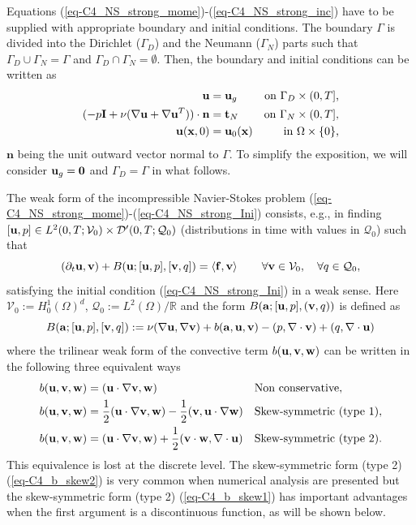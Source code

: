 Equations (\ref{eq-C4_NS_strong_mome})-(\ref{eq-C4_NS_strong_inc}) have to be supplied with appropriate boundary and initial conditions. The boundary $\Gamma$ is divided into the Dirichlet ($\Gamma_D$) and the Neumann ($\Gamma_N$) parts such that $\Gamma_D\cup\Gamma_N=\Gamma$ and $\Gamma_D\cap\Gamma_N=\emptyset$. Then, the boundary and initial conditions can be written as
\begin{align}
\label{eq-C4_NS_strong_Dir}
{\bf u}&={\bf u}_g&\mbox{on $\Gamma_D\times(0,T]$,}\\
\label{eq-C4_NS_strong_Neu}
(-p \mathbf{I}+\nu(\nabla{\bf u}+\nabla{\bf u}^T))\cdot\mathbf{n}&=\mathbf{t}_N&\mbox{on $\Gamma_N\times(0,T]$,}\\
\label{eq-C4_NS_strong_Ini}
{\bf u}({\bf x},0)&={\bf u}_0({\bf x})&\mbox{in $\Omega\times\{0\}$,}
\end{align}
$\mathbf{n}$ being the unit outward vector normal to $\Gamma$. To simplify the exposition, we will consider ${\bf u}_g = {\bf 0}$ and $\Gamma_D = \Gamma$ in what follows.

The weak form of the incompressible Navier-Stokes problem (\ref{eq-C4_NS_strong_mome})-(\ref{eq-C4_NS_strong_Ini}) consists, e.g., in finding $[{\bf u},p]\in {L}^2(0,T;\mathcal{V}_0)\times {\cal D}'(0,T;\mathcal{Q}_0)$ (distributions in time with values in $\mathcal{Q}_0$) such that
\begin{equation}
\label{eq-C4_NS_weak}
(\partial_t{\bf u},{\bf v}) + B({\bf u};[{\bf u},p],[{\bf v},q]) = \left<{\bf f},{\bf v}\right> 
\quad\quad\forall{\bf v}\in\mathcal{V}_0,\quad\forall q\in\mathcal{Q}_0,
\end{equation}
satisfying the initial condition (\ref{eq-C4_NS_strong_Ini}) in a weak sense. Here $\mathcal{V}_0:={H}_0^1(\Omega)^d$, $\mathcal{Q}_0:=L^2(\Omega)/\mathbb{R}$ and the form $B({{\bf a}};[{\bf u},p],({\bf v},q))$ is defined as 
\begin{equation}
\label{eq-C4_bilinear}
B({\bf a};[{\bf u},p],[{\bf v},q]):=\nu(\nabla{\bf u},\nabla{\bf v})+b({\bf a},{\bf u},{\bf v})-(p,\nabla\cdot{\bf v})+(q,\nabla\cdot{\bf u})
\end{equation}
where the trilinear weak form of the convective term $b({\bf u},{\bf v},{\bf w})$ can be written in the following three equivalent ways
\begin{align}
\label{eq-C4_b_noskew}
&b({\bf u},{\bf v},{\bf w})=({\bf u}\cdot\nabla{\bf v},{\bf w})&&\mbox{Non conservative},\\
\label{eq-C4_b_skew1}
&b({\bf u},{\bf v},\mathbf{w})=\frac{1}{2}({\bf u}\cdot\nabla{\bf v},\mathbf{w})-\frac{1}{2}({\bf v},{\bf u}\cdot\nabla\mathbf{w})&&\mbox{Skew-symmetric (type 1)},\\
\label{eq-C4_b_skew2}
&b({\bf u},{\bf v},\mathbf{w})=({\bf u}\cdot\nabla{\bf v},\mathbf{w})+\frac{1}{2}({\bf v}\cdot\mathbf{w},\nabla\cdot{\bf u})&&\mbox{Skew-symmetric (type 2)}.
\end{align}
This equivalence is lost at the discrete level. The skew-symmetric form (type 2) (\ref{eq-C4_b_skew2}) is very common when numerical analysis are presented \cite{Badia2013Convergence,Burman2009,guermond_faedogalerkin_2007} but the skew-symmetric form (type 2) (\ref{eq-C4_b_skew1}) has important advantages when the first argument is a discontinuous function, as will be shown below.

